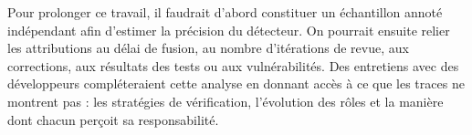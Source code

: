 \documentclass[12pt,a4paper,oneside]{report}
\begin{document}
Pour prolonger ce travail, il faudrait d'abord constituer un échantillon annoté indépendant afin d'estimer la précision du détecteur. On pourrait ensuite relier les attributions au délai de fusion, au nombre d'itérations de revue, aux corrections, aux résultats des tests ou aux vulnérabilités. Des entretiens avec des développeurs compléteraient cette analyse en donnant accès à ce que les traces ne montrent pas : les stratégies de vérification, l'évolution des rôles et la manière dont chacun perçoit sa responsabilité.

\printbibliography[heading=bibintoc,title={Bibliographie}]
\end{document}
